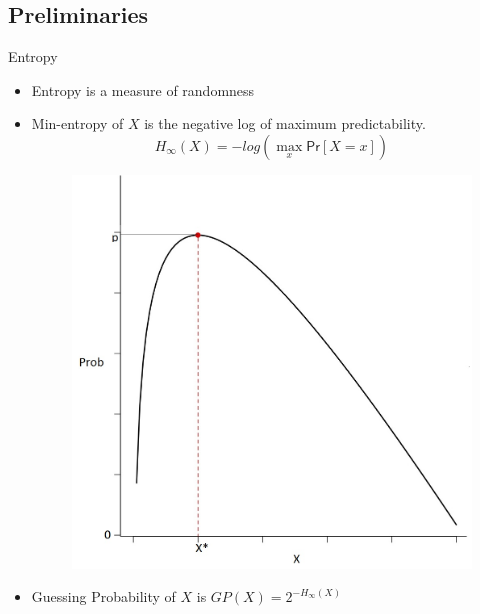 \documentclass{beamer}
\begin{document}
\subsection{Preliminaries}

\begin{frame}{Entropy}
	\begin{itemize}
		\setlength\itemsep{1em}
		\item Entropy is a measure of randomness
		\item Min-entropy of $X$ is the negative log of maximum predictability.
		\begin{equation*}
		    H_{\infty}(X) = - log(\max\limits_{x} \mathsf{Pr}[X=x])
		\end{equation*}
		\begin{figure}
		    \includegraphics[scale=0.2]{min_entropy}
		\end{figure}
		\item Guessing Probability of $X$ is $GP(X)=2^{-H_{\infty}(X)}$
	\end{itemize}
\end{frame}

\end{document}
